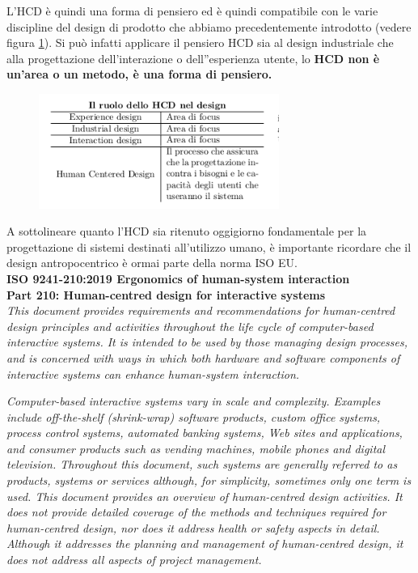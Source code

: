 L'HCD è quindi una forma di pensiero ed è quindi compatibile con le varie discipline del design di prodotto che abbiamo precedentemente introdotto (vedere figura \ref{hcd}). 
Si può infatti applicare il pensiero HCD sia al design industriale che alla progettazione dell'interazione o dell''esperienza utente, lo \textbf{HCD non è un'area o un metodo, è una forma di pensiero.}

\begin{figure}[!h]
	\centering
	\includegraphics[width=0.7\textwidth]{../immagini/HCD}
	
	\label{hcd}
\end{figure}

A sottolineare quanto l'HCD sia ritenuto oggigiorno fondamentale per la progettazione di sistemi destinati all'utilizzo umano, è importante ricordare che il design antropocentrico è ormai parte della norma ISO EU. \\

\textbf{ISO 9241-210:2019 Ergonomics of human-system interaction\\ Part 210: Human-centred design for interactive systems}\\

\textit{This document provides requirements and recommendations for human-centred design principles and activities throughout the life cycle of computer-based interactive systems. It is intended to be used by those managing design processes, and is concerned with ways in which both hardware and software components of interactive systems can enhance human-system interaction.}

\textit{Computer-based interactive systems vary in scale and complexity. Examples include off-the-shelf (shrink-wrap) software products, custom office systems, process control systems, automated banking systems, Web sites and applications, and consumer products such as vending machines, mobile phones and digital television. Throughout this document, such systems are generally referred to as products, systems or services although, for simplicity, sometimes only one term is used. This document provides an overview of human-centred design activities. It does not provide detailed coverage of the methods and techniques required for human-centred design, nor does it address health or safety aspects in detail. Although it addresses the planning and management of human-centred design, it does not address all aspects of project management. }

